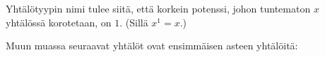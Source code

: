 
Yhtälötyypin nimi tulee siitä, että korkein potenssi, johon tuntematon $x$
yhtälössä korotetaan, on $1$. (Sillä $x^{1}=x$.)

\begin{esimerkki}
Muun muassa seuraavat yhtälöt ovat ensimmäisen asteen yhtälöitä:
\begin{alakohdat}
\end{alakohdat}
\end{esimerkki}

%		

